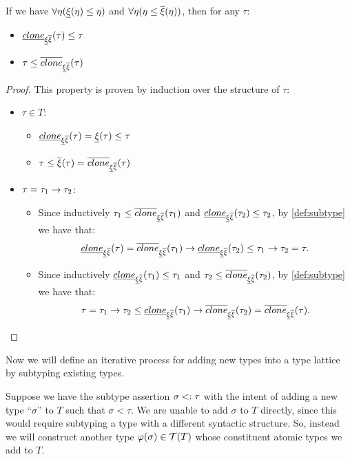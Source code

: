 \documentclass[main.tex]{subfiles}
\begin{document}
\begin{property}
    \label{prop:clone:rel}
    If we have $\forall \eta (\underline{\xi}(\eta) \leq \eta)$ and
    $\forall \eta (\eta \leq \overline{\xi}(\eta))$, then for
    any $\tau$:
    \begin{itemize}
        \item $\underline{clone}_{\underline{\xi} \overline{\xi}}(\tau) \leq \tau$
        \item $\tau \leq \overline{clone}_{\underline{\xi} \overline{\xi}}(\tau)$
    \end{itemize}
\end{property}
\begin{proof}
    This property is proven by induction over the structure of $\tau$:

    \begin{itemize}
        \item $\tau \in T$:
            \begin{itemize}
                \item $\underline{clone}_{\underline{\xi} \overline{\xi}}(\tau) = \underline{\xi}(\tau) \leq \tau$
                \item $\tau \leq \overline{\xi}(\tau) = \overline{clone}_{\underline{\xi} \overline{\xi}}(\tau)$
            \end{itemize}
        \item $\tau = \tau_1 \rightarrow \tau_2$:
            \begin{itemize}
                \item Since inductively $\tau_1 \leq \overline{clone}_{\underline{\xi} \overline{\xi}}(\tau_1)$
                    and $\underline{clone}_{\underline{\xi} \overline{\xi}}(\tau_2) \leq \tau_2$, by \cref{def:subtype}
                    we have that:
                    \[ \underline{clone}_{\underline{\xi} \overline{\xi}}(\tau) = \overline{clone}_{\underline{\xi} \overline{\xi}}(\tau_1) \rightarrow \underline{clone}_{\underline{\xi} \overline{\xi}}(\tau_2)
                    \leq \tau_1 \rightarrow \tau_2 = \tau. \]
                \item Since inductively $\underline{clone}_{\underline{\xi} \overline{\xi}}(\tau_1) \leq \tau_1$
                    and $\tau_2 \leq \overline{clone}_{\underline{\xi} \overline{\xi}}(\tau_2)$, by \cref{def:subtype}
                    we have that:
                    \[ \tau = \tau_1 \rightarrow \tau_2 \leq
                    \underline{clone}_{\underline{\xi} \overline{\xi}}(\tau_1) \rightarrow \overline{clone}_{\underline{\xi} \overline{\xi}}(\tau_2) = \overline{clone}_{\underline{\xi} \overline{\xi}}(\tau). \]
            \end{itemize}
    \end{itemize}
\end{proof}

Now we will define an iterative process for adding new types into a type lattice
by subtyping existing types.

Suppose we have the subtype assertion $\sigma <: \tau$ with the intent of adding
a new type ``$\sigma$'' to $T$ such that $\sigma \less \tau$. We are unable to add $\sigma$
to $T$ directly, since this would require subtyping a type with a different syntactic
structure. So, instead we will construct another type $\varphi(\sigma) \in \mathcal{T}( T )$
whose constituent atomic types we add to $T$.
\end{document}
